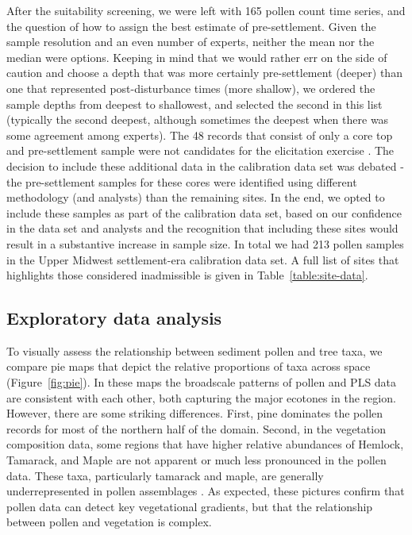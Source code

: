 \documentclass[12pt]{article}
\begin{document}
After the suitability screening, we were left with 165 pollen count
time series, and the question of how to assign the best estimate of
pre-settlement. Given the sample resolution and an even number of
experts, neither the mean nor the median were options. Keeping in mind
that we would rather err on the side of caution and choose a depth
that was more certainly pre-settlement (deeper) than one that
represented post-disturbance times (more shallow), we ordered the
sample depths from deepest to shallowest, and selected the second in
this list (typically the second deepest, although sometimes the
deepest when there was some agreement among experts).  The 48 records
that consist of only a core top and pre-settlement sample were not
candidates for the elicitation exercise . The decision to include
these additional data in the calibration data set was debated - the
pre-settlement samples for these cores were identified using different
methodology (and analysts) than the remaining sites. In the end, we
opted to include these samples as part of the calibration data set,
based on our confidence in the data set and analysts and the
recognition that including these sites would result in a substantive
increase in sample size. In total we had 213 pollen samples in the
Upper Midwest settlement-era calibration data set. A full list of
sites that highlights those considered inadmissible is given in
Table~\ref{table:site-data}.

\subsection{Exploratory data analysis}

To visually assess the relationship between sediment pollen and tree
taxa, we compare pie maps that depict the relative proportions of taxa
across space (Figure~\ref{fig:pie}). In these maps the broadscale
patterns of pollen and PLS data are consistent with each other, both
capturing the major ecotones in the region.  However, there are some
striking differences. First, pine dominates the pollen records for
most of the northern half of the domain. Second, in the vegetation
composition data, some regions that have higher relative abundances of
Hemlock, Tamarack, and Maple are not apparent or much less pronounced
in the pollen data. These taxa, particularly tamarack and maple, are
generally underrepresented in pollen assemblages
\citep{webb1981estimating, bradshaw1985relationships, jackson1990}. As
expected, these pictures confirm that pollen data can detect key
vegetational gradients, but that the relationship between pollen and
vegetation is complex.
\end{document}
